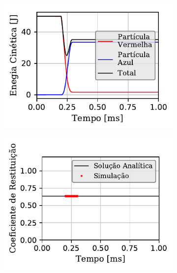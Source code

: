 \begin{figure}[htb!]
{\begin{subfigure}[t]{\smallresultsfigwidth}
		\end{subfigure}
		\begin{subfigure}[t]{\smallresultsfigwidth}
			\centering
			\includegraphics[scale=1]{images/colliding_spheres/dissipative/kineticEnergy_small_total_alternative.pdf}
			\caption{}
			\label{subfig:colliding_spheres:dissipative:kinetic_energy}
		\end{subfigure}
		\begin{subfigure}[t]{\smallresultsfigwidth}
			\centering
			\includegraphics[scale=1]{images/colliding_spheres/dissipative/coefficient_of_restitution_small.pdf}
			\caption{}
			\label{subfig:colliding_spheres:dissipative:coefficient_of_restitution}
		\end{subfigure}
	}
	\label{fig:colliding_spheres:dissipative:results}
	\sourceMe
\end{figure}

